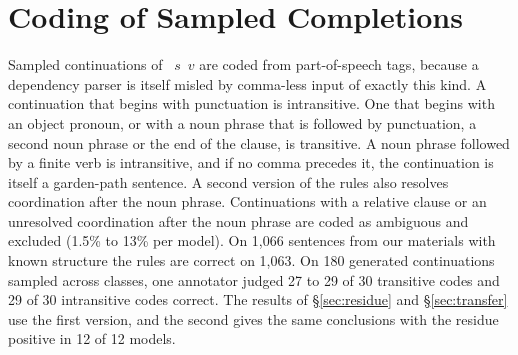 \section{Coding of Sampled Completions}
\label{app:coding}

Sampled continuations of ~$s$~$v$ are coded from part-of-speech tags, because a dependency parser is itself misled by comma-less input of exactly this kind.
A continuation that begins with punctuation is intransitive.
One that begins with an object pronoun, or with a noun phrase that is followed by punctuation, a second noun phrase or the end of the clause, is transitive.
A noun phrase followed by a finite verb is intransitive, and if no comma precedes it, the continuation is itself a garden-path sentence.
A second version of the rules also resolves coordination after the noun phrase.
Continuations with a relative clause or an unresolved coordination after the noun phrase are coded as ambiguous and excluded (1.5\% to 13\% per model).
On 1,066 sentences from our materials with known structure the rules are correct on 1,063.
On 180 generated continuations sampled across classes, one annotator judged 27 to 29 of 30 transitive codes and 29 of 30 intransitive codes correct.
The results of \S\ref{sec:residue} and \S\ref{sec:transfer} use the first version, and the second gives the same conclusions with the residue positive in 12 of 12 models.

